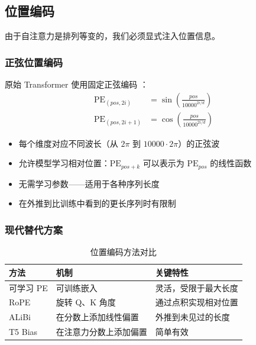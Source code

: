 \subsection{位置编码}

由于自注意力是排列等变的，我们必须显式注入位置信息。

\subsubsection{正弦位置编码}

原始 Transformer 使用固定正弦编码 \cite{vaswani2017attention}：
\begin{align}
\text{PE}_{(pos, 2i)} &= \sin\left(\frac{pos}{10000^{2i/d}}\right) \\
\text{PE}_{(pos, 2i+1)} &= \cos\left(\frac{pos}{10000^{2i/d}}\right)
\end{align}

\begin{properties}[正弦 PE 的特性]
\begin{itemize}
    \item 每个维度对应不同波长（从 $2\pi$ 到 $10000 \cdot 2\pi$）的正弦波
    \item 允许模型学习相对位置：$\text{PE}_{pos+k}$ 可以表示为 $\text{PE}_{pos}$ 的线性函数
    \item 无需学习参数——适用于各种序列长度
    \item 在外推到比训练中看到的更长序列时有限制
\end{itemize}
\end{properties}

\subsubsection{现代替代方案}

\begin{table}[ht]
    \centering
    \caption{位置编码方法对比}
    \begin{tabular}{L{2.5cm} L{4cm} L{4.5cm}}
        \toprule
        \textbf{方法} & \textbf{机制} & \textbf{关键特性} \\
        \midrule
        可学习 PE & 可训练嵌入 & 灵活，受限于最大长度 \\
        RoPE & 旋转 Q、K 角度 & 通过点积实现相对位置 \\
        ALiBi & 在分数上添加线性偏置 & 外推到未见过的长度 \\
        T5 Bias & 在注意力分数上添加偏置 & 简单有效 \\
        \bottomrule
    \end{tabular}
\end{table}

